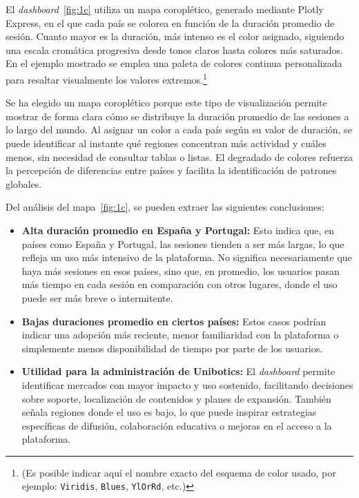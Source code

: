 \documentclass[a4paper, 12pt]{book}
\begin{document}
El \textit{dashboard}~\ref{fig:1c} utiliza un mapa coroplético, generado mediante Plotly Express, en el que cada país se colorea en función de la duración promedio de sesión. Cuanto mayor es la duración, más intenso es el color asignado, siguiendo una escala cromática progresiva desde tonos claros hasta colores más saturados. En el ejemplo mostrado se emplea una paleta de colores continua personalizada para resaltar visualmente los valores extremos.\footnote{(Es posible indicar aquí el nombre exacto del esquema de color usado, por ejemplo: \texttt{Viridis}, \texttt{Blues}, \texttt{YlOrRd}, etc.)}

Se ha elegido un mapa coroplético porque este tipo de visualización permite mostrar de forma clara cómo se distribuye la duración promedio de las sesiones a lo largo del mundo. Al asignar un color a cada país según su valor de duración, se puede identificar al instante qué regiones concentran más actividad y cuáles menos, sin necesidad de consultar tablas o listas. El degradado de colores refuerza la percepción de diferencias entre países y facilita la identificación de patrones globales.

Del análisis del mapa~\ref{fig:1c}, se pueden extraer las siguientes conclusiones:

\begin{itemize}
  \item \textbf{Alta duración promedio en España y Portugal:} Esto indica que, en países como España y Portugal, las sesiones tienden a ser más largas, lo que refleja un uso más intensivo de la plataforma. No significa necesariamente que haya más sesiones en esos países, sino que, en promedio, los usuarios pasan más tiempo en cada sesión en comparación con otros lugares, donde el uso puede ser más breve o intermitente.

  \item \textbf{Bajas duraciones promedio en ciertos países:} Estos casos podrían indicar una adopción más reciente, menor familiaridad con la plataforma o simplemente menos disponibilidad de tiempo por parte de los usuarios.

  \item \textbf{Utilidad para la administración de Unibotics:} El \textit{dashboard} permite identificar mercados con mayor impacto y uso sostenido, facilitando decisiones sobre soporte, localización de contenidos y planes de expansión. También señala regiones donde el uso es bajo, lo que puede inspirar estrategias específicas de difusión, colaboración educativa o mejoras en el acceso a la plataforma.
\end{itemize}
\end{document}
